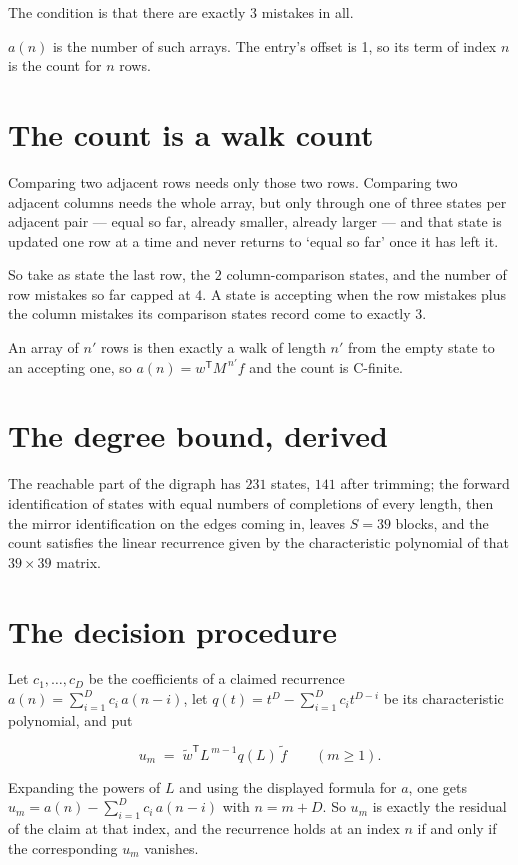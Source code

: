 \documentclass[11pt]{article}
\theoremstyle{definition}
\begin{document}
The condition is that there are exactly $3$ mistakes in all.

$a(n)$ is the number of such arrays. The entry's offset is 1, so its term of index $n$ is the count for $n$ rows.

\section{The count is a walk count}

Comparing two adjacent rows needs only those two rows. Comparing two adjacent columns needs the whole array, but only through one of three states per adjacent pair --- equal so far, already smaller, already larger --- and that state is updated one row at a time and never returns to `equal so far' once it has left it.

So take as state the last row, the $2$ column-comparison states, and the number of row mistakes so far capped at $4$. A state is accepting when the row mistakes plus the column mistakes its comparison states record come to exactly $3$.

An array of $n'$ rows is then exactly a walk of length $n'$ from the empty state to an accepting one, so $a(n) = w^{\mathsf T}M^{\,n'}f$ and the count is C-finite.

\section{The degree bound, derived}

The reachable part of the digraph has $231$ states, $141$ after trimming; the forward identification of states with equal numbers of completions of every length, then the mirror identification on the edges coming in, leaves $S = 39$ blocks, and the count satisfies the linear recurrence given by the characteristic polynomial of that $39\times39$ matrix.

\section{The decision procedure}

Let $c_1,\dots,c_D$ be the coefficients of a claimed recurrence $a(n) = \sum_{i=1}^{D} c_i\,a(n-i)$, let $q(t) = t^{D} - \sum_{i=1}^{D} c_i t^{D-i}$ be its characteristic polynomial, and put

\[u_m \;=\; \tilde w^{\mathsf T} L^{\,m-1} q(L)\,\tilde f \qquad (m \ge 1).\]

Expanding the powers of $L$ and using the displayed formula for $a$, one gets $u_m = a(n) - \sum_{i=1}^{D} c_i\,a(n-i)$ with $n = m + D$. So $u_m$ is exactly the residual of the claim at that index, and the recurrence holds at an index $n$ if and only if the corresponding $u_m$ vanishes.
\end{document}
